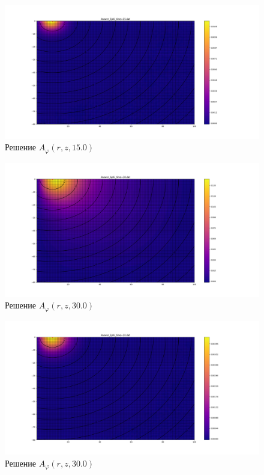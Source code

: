 \begin{figure}
	\centering
	\includegraphics[width=1.0\linewidth]{images/Answer_Ephi_time=15.png}
	\caption{Решение $A_{\varphi}(r, z, 15.0)$}
	\label{fig:E_phi_15}
\end{figure} 

\begin{figure}
	\centering
	\includegraphics[width=1.0\linewidth]{images/Answer_Aphi_time=30.png}
	\caption{Решение $A_{\varphi}(r, z, 30.0)$}
	\label{fig:A_phi_30}
\end{figure}

\begin{figure}
	\centering
	\includegraphics[width=1.0\linewidth]{images/Answer_Ephi_time=30.png}
	\caption{Решение $A_{\varphi}(r, z, 30.0)$}
	\label{fig:E_phi_30}
\end{figure} 

